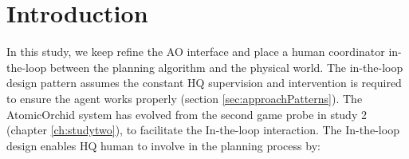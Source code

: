 

\section{Introduction}


In this study, we keep refine the \ac{AO} interface and place a human coordinator in-the-loop between the planning algorithm and the physical world. The in-the-loop design pattern assumes the constant HQ supervision and intervention is required to ensure the agent works properly (section \ref{sec:approachPatterns}). The AtomicOrchid system has evolved from the second game probe in study 2 (chapter \ref{ch:studytwo}), to facilitate the In-the-loop interaction. The In-the-loop design enables HQ human to involve in the planning process by: \\


